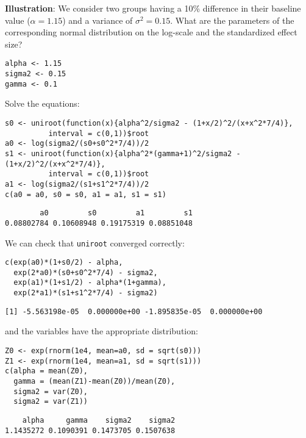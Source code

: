 \documentclass[12pt]{article}
\begin{document}
\textbf{Illustration}: We consider two groups having a 10\% difference
in their baseline value (\(\alpha=1.15\)) and a variance of \(\sigma^2
= 0.15\). What are the parameters of the corresponding normal
distribution on the log-scale and the standardized effect size?
\lstset{language=r,label= ,caption= ,captionpos=b,numbers=none}
\begin{lstlisting}
alpha <- 1.15
sigma2 <- 0.15
gamma <- 0.1
\end{lstlisting}

Solve the equations:
\lstset{language=r,label= ,caption= ,captionpos=b,numbers=none}
\begin{lstlisting}
s0 <- uniroot(function(x){alpha^2/sigma2 - (1+x/2)^2/(x+x^2*7/4)},
	      interval = c(0,1))$root
a0 <- log(sigma2/(s0+s0^2*7/4))/2
s1 <- uniroot(function(x){alpha^2*(gamma+1)^2/sigma2 - (1+x/2)^2/(x+x^2*7/4)},
	      interval = c(0,1))$root
a1 <- log(sigma2/(s1+s1^2*7/4))/2
c(a0 = a0, s0 = s0, a1 = a1, s1 = s1)
\end{lstlisting}

\begin{verbatim}
        a0         s0         a1         s1 
0.08802784 0.10608948 0.19175319 0.08851048
\end{verbatim}

We can check that \texttt{uniroot} converged correctly:
\lstset{language=r,label= ,caption= ,captionpos=b,numbers=none}
\begin{lstlisting}
c(exp(a0)*(1+s0/2) - alpha, 
  exp(2*a0)*(s0+s0^2*7/4) - sigma2, 
  exp(a1)*(1+s1/2) - alpha*(1+gamma), 
  exp(2*a1)*(s1+s1^2*7/4) - sigma2)
\end{lstlisting}

\begin{verbatim}
[1] -5.563198e-05  0.000000e+00 -1.895835e-05  0.000000e+00
\end{verbatim}

and the variables have the appropriate distribution:
\lstset{language=r,label= ,caption= ,captionpos=b,numbers=none}
\begin{lstlisting}
Z0 <- exp(rnorm(1e4, mean=a0, sd = sqrt(s0)))
Z1 <- exp(rnorm(1e4, mean=a1, sd = sqrt(s1)))
c(alpha = mean(Z0), 
  gamma = (mean(Z1)-mean(Z0))/mean(Z0), 
  sigma2 = var(Z0), 
  sigma2 = var(Z1))
\end{lstlisting}

\begin{verbatim}
    alpha     gamma    sigma2    sigma2 
1.1435272 0.1090391 0.1473705 0.1507638
\end{verbatim}
\end{document}
